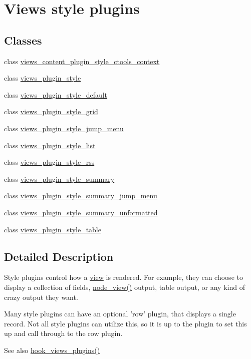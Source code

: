 \hypertarget{group__views__style__plugins}{
\section{Views style plugins}
\label{group__views__style__plugins}
}
\subsection*{Classes}
\begin{DoxyCompactItemize}
\item 
class \hyperlink{classviews__content__plugin__style__ctools__context}{views\_\-content\_\-plugin\_\-style\_\-ctools\_\-context}
\item 
class \hyperlink{classviews__plugin__style}{views\_\-plugin\_\-style}
\item 
class \hyperlink{classviews__plugin__style__default}{views\_\-plugin\_\-style\_\-default}
\item 
class \hyperlink{classviews__plugin__style__grid}{views\_\-plugin\_\-style\_\-grid}
\item 
class \hyperlink{classviews__plugin__style__jump__menu}{views\_\-plugin\_\-style\_\-jump\_\-menu}
\item 
class \hyperlink{classviews__plugin__style__list}{views\_\-plugin\_\-style\_\-list}
\item 
class \hyperlink{classviews__plugin__style__rss}{views\_\-plugin\_\-style\_\-rss}
\item 
class \hyperlink{classviews__plugin__style__summary}{views\_\-plugin\_\-style\_\-summary}
\item 
class \hyperlink{classviews__plugin__style__summary__jump__menu}{views\_\-plugin\_\-style\_\-summary\_\-jump\_\-menu}
\item 
class \hyperlink{classviews__plugin__style__summary__unformatted}{views\_\-plugin\_\-style\_\-summary\_\-unformatted}
\item 
class \hyperlink{classviews__plugin__style__table}{views\_\-plugin\_\-style\_\-table}
\end{DoxyCompactItemize}


\subsection{Detailed Description}
Style plugins control how a \hyperlink{classview}{view} is rendered. For example, they can choose to display a collection of fields, \hyperlink{node_8module_ac2c64fdfacc25be79a6ecf406ab62320}{node\_\-view()} output, table output, or any kind of crazy output they want.

Many style plugins can have an optional 'row' plugin, that displays a single record. Not all style plugins can utilize this, so it is up to the plugin to set this up and call through to the row plugin.

\begin{DoxySeeAlso}{See also}
\hyperlink{group__views__hooks_ga23f6e9972b2ed84fc54b7ff63f44477d}{hook\_\-views\_\-plugins()} 
\end{DoxySeeAlso}
